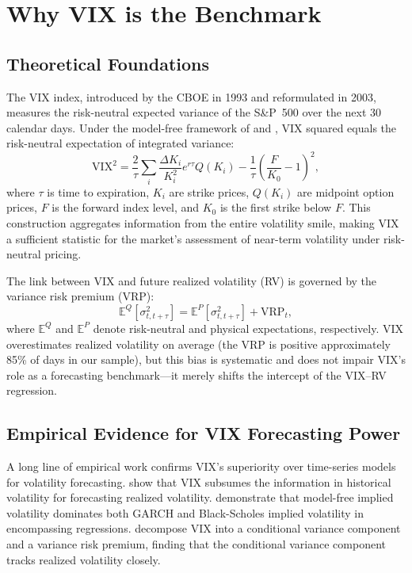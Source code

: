 \documentclass[12pt,a4paper]{article}
\begin{document}
\section{Why VIX is the Benchmark}
\label{sec:whyvix}

\subsection{Theoretical Foundations}

The VIX index, introduced by the CBOE in 1993 and reformulated in 2003, measures the risk-neutral expected variance of the S\&P~500 over the next 30 calendar days. Under the model-free framework of \citet{britten2000} and \citet{jiang2005}, VIX squared equals the risk-neutral expectation of integrated variance:
\begin{equation}
\text{VIX}^2 = \frac{2}{\tau} \sum_i \frac{\Delta K_i}{K_i^2} e^{r\tau} Q(K_i) - \frac{1}{\tau}\left(\frac{F}{K_0}-1\right)^2,
\label{eq:vix}
\end{equation}
where $\tau$ is time to expiration, $K_i$ are strike prices, $Q(K_i)$ are midpoint option prices, $F$ is the forward index level, and $K_0$ is the first strike below $F$. This construction aggregates information from the entire volatility smile, making VIX a sufficient statistic for the market's assessment of near-term volatility under risk-neutral pricing.

The link between VIX and future realized volatility (RV) is governed by the variance risk premium (VRP):
\begin{equation}
\mathbb{E}^Q[\sigma^2_{t,t+\tau}] = \mathbb{E}^P[\sigma^2_{t,t+\tau}] + \text{VRP}_t,
\label{eq:vrp}
\end{equation}
where $\mathbb{E}^Q$ and $\mathbb{E}^P$ denote risk-neutral and physical expectations, respectively. VIX overestimates realized volatility on average (the VRP is positive approximately 85\% of days in our sample), but this bias is systematic and does not impair VIX's role as a forecasting benchmark---it merely shifts the intercept of the VIX--RV regression.

\subsection{Empirical Evidence for VIX Forecasting Power}

A long line of empirical work confirms VIX's superiority over time-series models for volatility forecasting. \citet{christensen1998} show that VIX subsumes the information in historical volatility for forecasting realized volatility. \citet{jiang2005} demonstrate that model-free implied volatility dominates both GARCH and Black-Scholes implied volatility in encompassing regressions. \citet{bekaert2014} decompose VIX into a conditional variance component and a variance risk premium, finding that the conditional variance component tracks realized volatility closely.
\end{document}
